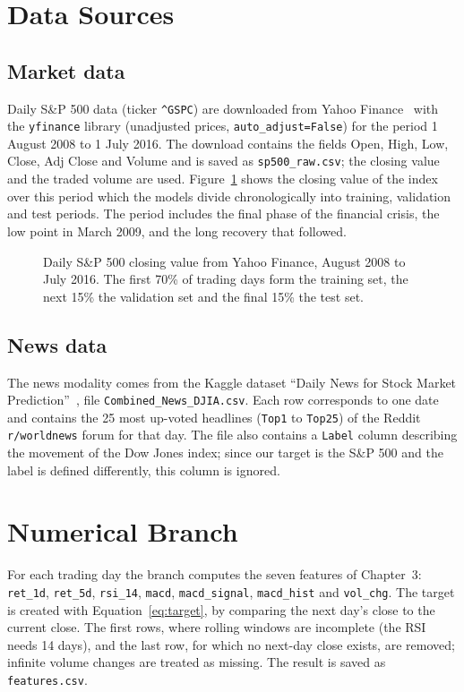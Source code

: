 \section{Data Sources}

\subsection{Market data}
Daily S\&P 500 data (ticker \texttt{\textasciicircum GSPC}) are downloaded from Yahoo Finance~\cite{yahoofinance} with the \texttt{yfinance} library (unadjusted prices, \texttt{auto\_adjust=False}) for the period 1 August 2008 to 1 July 2016. The download contains the fields Open, High, Low, Close, Adj Close and Volume and is saved as \texttt{sp500\_raw.csv}; the closing value and the traded volume are used. Figure~\ref{fig:sp500} shows the closing value of the index over this period which the models divide chronologically into training, validation and test periods. The period includes the final phase of the financial crisis, the low point in March 2009, and the long recovery that followed.

\begin{figure}[!htbp]
\centering
{}
\caption{Daily S\&P 500 closing value from Yahoo Finance, August 2008 to July 2016. The first 70\% of trading days form the training set, the next 15\% the validation set and the final 15\% the test set.}
\label{fig:sp500}
\end{figure}

\subsection{News data}
The news modality comes from the Kaggle dataset ``Daily News for Stock Market Prediction''~\cite{kaggledaily}, file \texttt{Combined\_News\_DJIA.csv}. Each row corresponds to one date and contains the 25 most up-voted headlines (\texttt{Top1} to \texttt{Top25}) of the Reddit \texttt{r/worldnews} forum for that day. The file also contains a \texttt{Label} column describing the movement of the Dow Jones index; since our target is the S\&P 500 and the label is defined differently, this column is ignored.

\section{Numerical Branch}
For each trading day the branch computes the seven features of Chapter~3: \texttt{ret\_1d}, \texttt{ret\_5d}, \texttt{rsi\_14}, \texttt{macd}, \texttt{macd\_signal}, \texttt{macd\_hist} and \texttt{vol\_chg}. The target is created with Equation~\ref{eq:target}, by comparing the next day's close to the current close. The first rows, where rolling windows are incomplete (the RSI needs 14 days), and the last row, for which no next-day close exists, are removed; infinite volume changes are treated as missing. The result is saved as \texttt{features.csv}.

